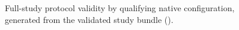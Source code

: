 \begin{figure}[t]
  \centering
  
  \caption{Full-study protocol validity by qualifying native configuration,
  generated from the validated study bundle
  ().}
  \label{fig:native-validity}
\end{figure}
